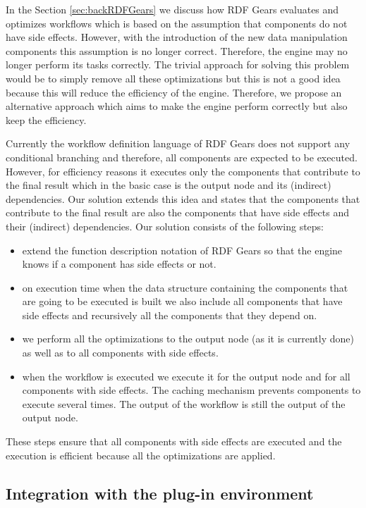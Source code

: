 In the Section \ref{sec:backRDFGears} we discuss how RDF Gears evaluates and optimizes workflows which is based on the assumption that components do not have side effects. However, with the introduction of the new data manipulation components this assumption is no longer correct. Therefore, the engine may no longer perform its tasks correctly. The trivial approach for solving this problem would be to simply remove all these optimizations but this is not a good idea because this will reduce the efficiency of the engine. Therefore, we propose an alternative approach which aims to make the engine perform correctly but also keep the efficiency.

Currently the workflow definition language of RDF Gears does not support any conditional branching \cite{feliksik2011} and therefore, all components are expected to be executed. However, for efficiency reasons it executes only the components that contribute to the final result which in the basic case is the output node and its (indirect) dependencies. Our solution extends this idea and states that the components that contribute to the final result are also the components that have side effects and their (indirect) dependencies. Our solution consists of the following steps:

\begin{itemize}
	\item extend the function description notation of RDF Gears so that the engine knows if a component has side effects or not.
	\item on execution time when the data structure containing the components that are going to be executed is built we also include all components that have side effects and recursively all the components that they depend on.
	\item we perform all the optimizations to the output node (as it is currently done) as well as to all components with side effects. 
	\item when the workflow is executed we execute it for the output node and for all components with side effects. The caching mechanism prevents components to execute several times. The output of the workflow is still the output of the output node.
\end{itemize}

These steps ensure that all components with side effects are executed and the execution is efficient because all the optimizations are applied.

\subsection{Integration with the plug-in environment}

